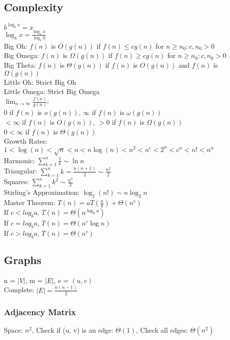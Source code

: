 \documentclass{article}
\begin{document}
\begin{multicols*}{2}
        \subsection*{Complexity}
        $b^{\log_b x} = x$\\
        $\log_b x = \frac{\log_c x}{\log_c b}$\\
        Big Oh: $f(n)$ is $O(g(n))$ if $f(n) \leq cg(n)$ for $n \geq n_0 : c, n_0 > 0$\\
        Big Omega: $f(n)$ is $\Omega(g(n))$ if $f(n) \geq cg(n)$ for $n \geq n_0 : c, n_0 > 0$\\
        Big Theta: $f(n)$ is $\Theta(g(n))$ if $f(n)$ is $O(g(n))$ and $f(n)$ is $\Omega(g(n))$\\
        Little Oh: Strict Big Oh\\
        Little Omega: Strict Big Omega\\
        $\lim_{n\to\infty}\frac{f(n)}{g(n)}$:\\
        0 if $f(n)$ is $o(g(n))$, $\infty$ if $f(n)$ is $\omega(g(n))$\\
        $< \infty$ if $f(n)$ is $O(g(n))$, $> 0$ if $f(n)$ is $\Omega(g(n))$\\
        $0 < \infty$ if $f(n)$ is $\Theta(g(n))$\\
        Growth Rates: $1 < \log(n) < \sqrt{n} < n < n\log(n) < n^2 < n^c < 2^n < c^n < n! < n^n$\\
        Harmonic: $\sum_{k=1}^{n} \frac{1}{k} \sim \ln n$\\
        Triangular: $\sum_{k=1}^{n} k = \frac{n(n + 1)}{2} \sim \frac{n^2}{2}$\\
        Squares: $\sum_{k=1}^{n} k^2 \sim \frac{n^3}{3}$\\
        Stirling's Approximation: $\log_2(n!) \sim n\log_2 n$\\
        Master Theorem: $T(n) = aT(\frac{n}{b}) + \Theta(n^c)$\\
        If $c < log_b a$, $T(n) = \Theta(n^{\log_b a})$\\
        If $c = log_b a$, $T(n) = \Theta(n^c\log n)$\\
        If $c > log_b a$, $T(n) = \Theta(n^c)$
        \subsection*{Graphs}
        n = $\rvert V \lvert$, m = $\rvert E \lvert$, e = $(u, v)$\\
        Complete: $\lvert E \rvert = \frac{n(n - 1)}{2}$
        \subsubsection*{Adjacency Matrix}
        Space: $n^2$, Check if (u, v) is an edge: $\Theta(1)$, Check all edges: $\Theta(n^2)$

\end{multicols*}
\end{document}

